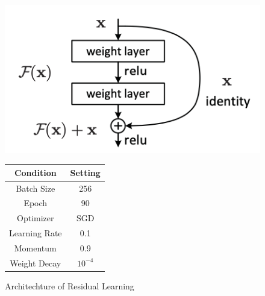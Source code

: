 \begin{figure}[ht]
	\begin{minipage}{0.5\linewidth}
		\centering
		\includegraphics[width=\textwidth]{figs/residual_block.png}
		\caption{Architechture of Residual Learning\cite{resnet2016}}
		\label{fig:res}
	\end{minipage}\hfill
	\begin{minipage}{0.5\linewidth}
		\centering
		\begin{tabular}{cc}
			\toprule  %
			Condition     & Setting   \\
			\midrule  %
			Batch Size    & 256       \\
			Epoch         & 90        \\
			Optimizer     & SGD       \\
			Learning Rate & 0.1       \\
			Momentum      & 0.9       \\
			Weight Decay  & $10^{-4}$ \\
			\bottomrule  %
		\end{tabular}
		\label{table:train_condition}
	\end{minipage}
\end{figure}



